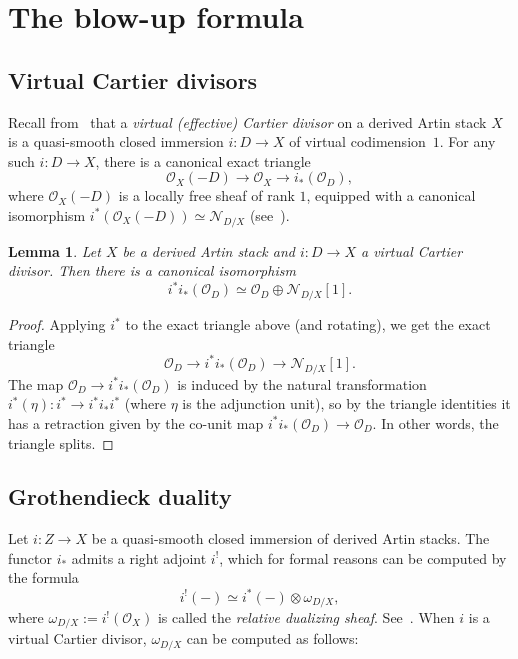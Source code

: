 \documentclass[11pt]{article}
\newtheorem{lemm}[theo]{Lemma}
\theoremstyle{definition}
\numberwithin{equation}{section}
\numberwithin{figure}{section}
\numberwithin{table}{section}
\newcommand{\sN}{\ensuremath{\mathcal{N}}\xspace}
\newcommand{\sO}{\ensuremath{\mathcal{O}}\xspace}
\begin{document}
\section{The blow-up formula}\label{sec:blowup}

\subsection{Virtual Cartier divisors}

Recall from~\cite{KhanBlowup} that a \emph{virtual (effective) Cartier divisor} on a derived Artin stack $X$ is a quasi-smooth closed immersion $i : D \to X$ of virtual codimension~$1$. For any such $i : D \to X$, there is a canonical exact triangle
\[
\sO_X(-D) \to \sO_X \to i_*(\sO_D),
\]
where $\sO_X(-D)$ is a locally free sheaf of rank $1$, equipped with a canonical isomorphism $i^*(\sO_X(-D)) \simeq \sN_{D/X}$ (see~\cite[3.2.3 and 3.2.9]{KhanBlowup}).

\begin{lemm}\label{lem:i^*i_*(O_D)}
Let $X$ be a derived Artin stack and $i : D \to X$ a virtual Cartier divisor. Then there is a canonical isomorphism
\[
i^*i_*(\sO_D) \simeq \sO_D \oplus \sN_{D/X}[1].
\]
\end{lemm}

\begin{proof}
Applying $i^*$ to the exact triangle above (and rotating), we get the exact triangle
\[
\sO_D \to i^*i_*(\sO_D) \to \sN_{D/X}[1].
\]
The map $\sO_D \to i^*i_*(\sO_D)$ is induced by the natural transformation $i^*(\eta) : i^* \to i^*i_*i^*$ (where $\eta$ is the adjunction unit), so by the triangle identities it has a retraction given by the co-unit map $i^*i_*(\sO_D) \to \sO_D$. In other words, the triangle splits.
\end{proof}

\subsection{Grothendieck duality}

Let $i : Z \to X$ be a quasi-smooth closed immersion of derived Artin stacks. The functor $i_*$ admits a right adjoint $i^!$, which for formal reasons can be computed by the formula
\[
i^!(-) \simeq i^*(-) \otimes \omega_{D/X},
\]
where $\omega_{D/X} := i^!(\sO_X)$ is called the \emph{relative dualizing sheaf}. See~\cite[Corollary 6.4.2.7]{SAG-20180204}. When $i$ is a virtual Cartier divisor, $\omega_{D/X}$ can be computed as follows:
\end{document}
